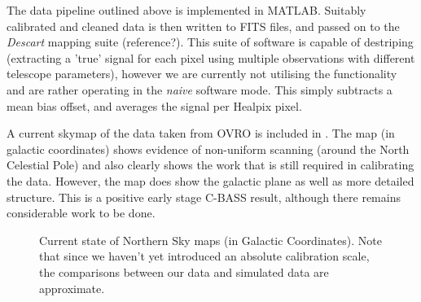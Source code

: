 The data pipeline outlined above is implemented in MATLAB. Suitably calibrated and cleaned data is then written to FITS files, and passed on to the \textit{Descart} mapping suite (reference?). This suite of software is capable of destriping (extracting a 'true' signal for each pixel using multiple observations with different telescope parameters), however we are currently not utilising the functionality and are rather operating in the \textit{naive} software mode. This simply subtracts a mean bias offset, and averages the signal per Healpix pixel.

A current skymap of the data taken from OVRO is included in . The map (in galactic coordinates) shows evidence of non-uniform scanning (around the North Celestial Pole) and also clearly shows the work that is still required in calibrating the data. However, the map does show the galactic plane as well as more detailed structure. This is a positive early stage C-BASS result, although there remains considerable work to be done.



\begin{figure}
 \centering
\hspace{0.1cm}

 \caption{Current state of Northern Sky maps (in Galactic Coordinates). Note that since we haven't yet introduced an absolute calibration scale, the comparisons between our data and simulated data are approximate.}
 \label{fig:northSkySurvey}
\end{figure}

